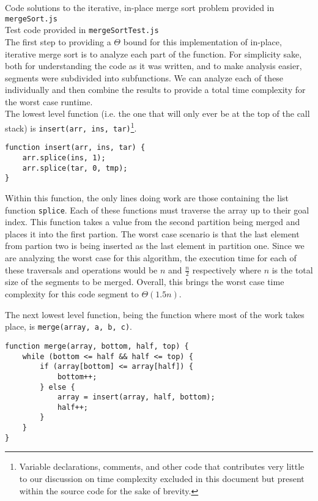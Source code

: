 \documentclass[12pt]{article}
\begin{document}
Code solutions to the iterative, in-place merge sort problem provided in \texttt{mergeSort.js} \\

Test code provided in \texttt{mergeSortTest.js} \\

The first step to providing a $\Theta$ bound for this implementation of in-place, iterative merge sort is to analyze each part of the function. For simplicity sake, both for understanding the code as it was written, and to make analysis easier, segments were subdivided into subfunctions. We can analyze each of these individually and then combine the results to provide a total time complexity for the worst case runtime. \\

The lowest level function (i.e. the one that will only ever be at the top of the call stack) is \texttt{insert(arr, ins, tar)}\footnote{Variable declarations, comments, and other code that contributes very little to our discussion on time complexity excluded in this document but present within the source code for the sake of brevity.}.

\begin{lstlisting}
function insert(arr, ins, tar) {
    arr.splice(ins, 1);
    arr.splice(tar, 0, tmp);
}
\end{lstlisting}

Within this function, the only lines doing work are those containing the list function \texttt{splice}. Each of these functions must traverse the array up to their goal index. This function takes a value from the second partition being merged and places it into the first partion. The worst case scenario is that the last element from partion two is being inserted as the last element in partition one. Since we are analyzing the worst case for this algorithm, the execution time for each of these traversals and operations would be $n$ and $\frac{n}{2}$ respectively where $n$ is the total size of the segments to be merged. Overall, this brings the worst case time complexity for this code segment to $\Theta(1.5n)$.

The next lowest level function, being the function where most of the work takes place, is \texttt{merge(array, a, b, c)}.

\begin{lstlisting}
function merge(array, bottom, half, top) {
    while (bottom <= half && half <= top) {
        if (array[bottom] <= array[half]) {
            bottom++;
        } else {
            array = insert(array, half, bottom);
            half++;
        }
    }
}
\end{lstlisting}
\end{document}
